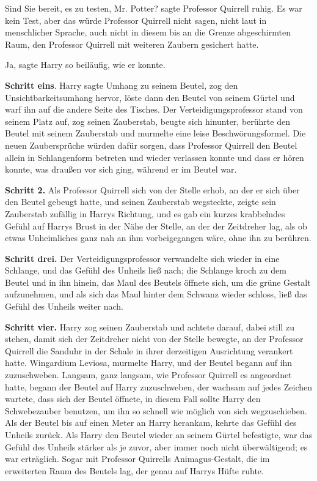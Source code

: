 \glqq{}Sind Sie bereit, es zu testen, Mr. Potter?\grqq{} sagte Professor Quirrell
ruhig. Es war kein Test, aber das würde Professor Quirrell nicht sagen, nicht
laut in menschlicher Sprache, auch nicht in diesem bis an die Grenze
abgeschirmten Raum, den Professor Quirrell mit weiteren Zaubern gesichert hatte.

\glqq{}Ja\grqq{}, sagte Harry so beiläufig, wie er konnte.

\textbf{Schritt eins}. Harry sagte \glqq{}Umhang\grqq{} zu seinem Beutel, zog den
Unsichtbarkeitsumhang hervor, löste dann den Beutel von seinem Gürtel und warf
ihn auf die andere Seite des Tisches. Der Verteidigungsprofessor stand von
seinem Platz auf, zog seinen Zauberstab, beugte sich hinunter, berührte den
Beutel mit seinem Zauberstab und murmelte eine leise Beschwörungsformel. Die
neuen Zaubersprüche würden dafür sorgen, dass Professor Quirrell den Beutel
allein in Schlangenform betreten und wieder verlassen konnte und dass er hören
konnte, was draußen vor sich ging, während er im Beutel war.

\textbf{Schritt 2.}
Als Professor Quirrell sich von der Stelle erhob, an der er sich über den Beutel
gebeugt hatte, und seinen Zauberstab wegsteckte, zeigte sein Zauberstab zufällig
in Harrys Richtung, und es gab ein kurzes krabbelndes Gefühl auf Harrys Brust in
der Nähe der Stelle, an der der Zeitdreher lag, als ob etwas Unheimliches ganz
nah an ihm vorbeigegangen wäre, ohne ihn zu berühren.

\textbf{Schritt drei.}
Der Verteidigungsprofessor verwandelte sich wieder in eine Schlange, und das
Gefühl des Unheils ließ nach; die Schlange kroch zu dem Beutel und in ihn
hinein, das Maul des Beutels öffnete sich, um die grüne Gestalt aufzunehmen, und
als sich das Maul hinter dem Schwanz wieder schloss, ließ das Gefühl des Unheils
weiter nach.

\textbf{Schritt vier.}
Harry zog seinen Zauberstab und achtete darauf, dabei still zu stehen, damit
sich der Zeitdreher nicht von der Stelle bewegte, an der Professor Quirrell die
Sanduhr in der Schale in ihrer derzeitigen Ausrichtung verankert hatte. \glqq{}
Wingardium Leviosa\grqq{}, murmelte Harry, und der Beutel begann auf ihn
zuzuschweben. Langsam, ganz langsam, wie Professor Quirrell es angeordnet hatte,
begann der Beutel auf Harry zuzuschweben, der wachsam auf jedes Zeichen wartete,
dass sich der Beutel öffnete, in diesem Fall sollte Harry den Schwebezauber
benutzen, um ihn so schnell wie möglich von sich wegzuschieben. Als der Beutel
bis auf einen Meter an Harry herankam, kehrte das Gefühl des Unheils zurück. Als
Harry den Beutel wieder an seinem Gürtel befestigte, war das Gefühl des Unheils
stärker als je zuvor, aber immer noch nicht überwältigend; es war erträglich.
Sogar mit Professor Quirrells Animagus-Gestalt, die im erweiterten Raum des
Beutels lag, der genau auf Harrys Hüfte ruhte.


